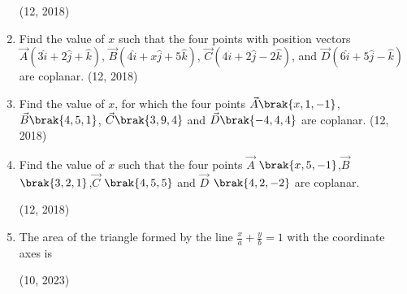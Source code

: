\begin{enumerate}[label=\thesubsection.\arabic*, ref=\thesubsection.\theenumi]
	\hfill (12, 2018)
\item Find the value of $x$ such that the four points with position vectors $\vec{A}(3\hat{i} + 2\hat{j} + \hat{k})$, $\vec{B}(4\hat{i} + x\hat{j} + 5\hat{k})$, $\vec{C}(4\hat{i} + 2\hat{j} - 2\hat{k})$, and $\vec{D}(6\hat{i} + 5\hat{j} - \hat{k})$ are coplanar. \hfill (12, 2018)
\item Find the value of $x$, for which the four points $\vec{A}\brak{x,1,-1}$, $\vec{B}\brak{4,5,1}$, $\vec{C}\brak{3,9,4}$ and $\vec{D}\brak{-4,4,4}$ are coplanar.
\hfill (12, 2018)
\item  Find the value of $x$ such that the four points $\vec{A}$ $\brak{x,5,-1}$,$\vec{B}$ $\brak{3,2,1}$,$\vec{C}$ $\brak{4,5,5}$ and $\vec{D}$ $\brak{4,2,-2}$ are coplanar.

\hfill (12, 2018) 
    \item The area of the triangle formed by the line $ \frac{x}{a} + \frac{y}{b} = 1 $ with the coordinate axes is 

    \hfill (10, 2023)
\end{enumerate}
